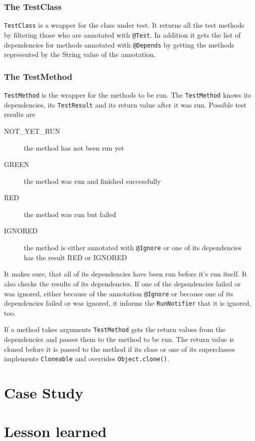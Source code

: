 \documentclass[11pt]{article}
\begin{document}
\subsubsection{The TestClass}

\verb|TestClass| is a wrapper for the class under test. It returns all the test methods by filtering those who are annotated with \verb|@Test|. In addition it gets the list of dependencies for methods annotated with \verb|@Depends| by getting the methods represented by the String value of the annotation.

\subsubsection{The TestMethod}

\verb|TestMethod| is the wrapper for the methods to be run. The \verb|TestMethod| knows its dependencies, its \verb|TestResult| and its return value after it was run. Possible test results are

\begin{description}
 \item[NOT\_YET\_RUN] the method has not been run yet
 \item[GREEN] the method was run and finished successfully
 \item[RED] the method was run but failed
 \item[IGNORED] the method is either annotated with \verb|@Ignore| or one of its dependencies has the result RED or IGNORED
 \end{description}

It makes sure, that all of its dependencies have been run before it's run itself. It also checks the results of its dependencies. If one of the dependencies failed or was ignored, either because of the annotation \verb|@Ignore| or because one of its dependencies failed or was ignored, it informs the \verb|RunNotifier| that it is ignored, too.

If a method takes arguments \verb|TestMethod| gets the return values from the dependencies and passes them to the method to be run. The return value is cloned before it is passed to the method if its class or one of its superclasses implements \verb|Cloneable| and overrides \verb|Object.clone()|.

\section{Case Study}

\section{Lesson learned}
\end{document}

